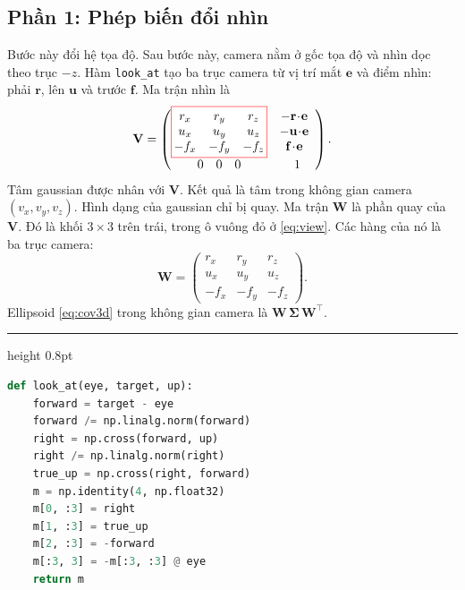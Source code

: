 \documentclass[9pt,twocolumn,a4paper]{extarticle}
\newenvironment{codebox}{\par\vspace{5pt}\noindent\begin{minipage}{\columnwidth}\hrule height 0.8pt\vspace{2pt}}{\end{minipage}\par\vspace{5pt}\noindent\ignorespaces}
\newcommand{\code}[1]{\texttt{#1}}
\newcommand{\Sig}{\symbf{\Sigma}}
\begin{document}
\subsection{Phần 1: Phép biến đổi nhìn}
\label{sec:cam}
Bước này đổi hệ tọa độ. Sau bước này, camera nằm ở gốc tọa độ và nhìn dọc theo trục $-z$. Hàm \code{look\_at} tạo ba trục camera từ vị trí mắt $\mathbf{e}$ và điểm nhìn: phải $\mathbf{r}$, lên $\mathbf{u}$ và trước $\mathbf{f}$. Ma trận nhìn là
\begin{equation}
\mathbf{V}=\begin{pmatrix}
\setlength{\fboxsep}{2pt}\fcolorbox{red}{white}{$\begin{matrix}
r_x&r_y&r_z\\u_x&u_y&u_z\\-f_x&-f_y&-f_z\end{matrix}$}
&\begin{matrix}-\mathbf{r}\!\cdot\!\mathbf{e}\\-\mathbf{u}\!\cdot\!\mathbf{e}\\ \mathbf{f}\!\cdot\!\mathbf{e}\end{matrix}\\[3mm]
\begin{matrix}0&0&0\end{matrix}&1\end{pmatrix}.
\label{eq:view}
\end{equation}
Tâm gaussian được nhân với $\mathbf{V}$. Kết quả là tâm trong không gian camera $(v_x,v_y,v_z)$. Hình dạng của gaussian chỉ bị quay. Ma trận $\mathbf{W}$ là phần quay của $\mathbf{V}$. Đó là khối $3\times3$ trên trái, trong ô vuông đỏ ở \eqref{eq:view}. Các hàng của nó là ba trục camera:
\begin{equation}
\mathbf{W}=\begin{pmatrix}
r_x&r_y&r_z\\u_x&u_y&u_z\\-f_x&-f_y&-f_z\end{pmatrix}.
\label{eq:W}
\end{equation}
Ellipsoid \eqref{eq:cov3d} trong không gian camera là $\mathbf{W}\,\Sig\,\mathbf{W}^{\top}$.

\begin{codebox}
\begin{lstlisting}[language=Python,caption={\code{core/math3d.py}, \code{look\_at}: ma trận nhìn $\mathbf{V}$},label={lst:lookat}]
def look_at(eye, target, up):
    forward = target - eye
    forward /= np.linalg.norm(forward)
    right = np.cross(forward, up)
    right /= np.linalg.norm(right)
    true_up = np.cross(right, forward)
    m = np.identity(4, np.float32)
    m[0, :3] = right
    m[1, :3] = true_up
    m[2, :3] = -forward
    m[:3, 3] = -m[:3, :3] @ eye
    return m
\end{lstlisting}
\end{codebox}
\end{document}
